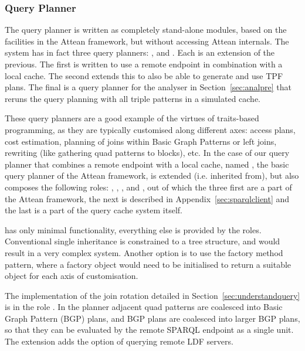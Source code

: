 \subsubsection{Query Planner}\label{sec:implqueryplan}

The query planner is written as completely stand-alone modules, based
on the facilities in the Attean framework, but without accessing
Attean internals. The system has in fact three query planners:
,
 and
. Each is an
extension of the previous. The first is written to use a remote
endpoint in combination with a local cache. The second extends this to
also be able to generate and use TPF plans. The
final is a query planner for the analyser in Section~\ref{sec:analpre}
that reruns the query planning with all triple patterns in a simulated
cache.

These query planners are a good example of the virtues of traits-based
programming, as they are typically customised along different axes:
access plans, cost estimation, planning of joins within Basic Graph
Patterns or left joins, rewriting (like gathering quad patterns to
blocks), etc. In the case of our query planner that combines a remote
endpoint with a local cache, named
, the basic query planner of the
Attean framework,  is extended
(i.e. inherited from), but also composes the following roles:
,
,
,
 and
, out of which the three
first are a part of the Attean framework, the next is described in
Appendix~\ref{sec:sparqlclient} and the last is a part of the
query cache system itself.


 has only minimal functionality,
everything else is provided by the roles. Conventional single
inheritance is constrained to a tree structure, and would result in a
very complex system. Another option is to use the factory method
pattern, where a factory object would need to be initialised to return
a suitable object for each axis of customisation. 

The implementation of the join rotation detailed in
Section~\ref{sec:understandquery} is in the role
. In the planner
 adjacent quad patterns are
coalesced into Basic Graph Pattern (BGP) plans, and BGP plans are
coalesced into larger BGP plans, so that they can be evaluated by the
remote SPARQL endpoint as a single unit. The extension
 adds the option of
querying remote LDF servers.

